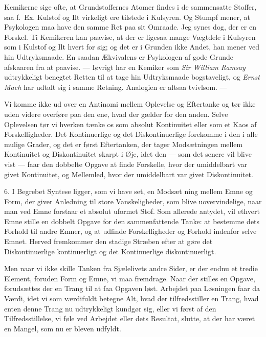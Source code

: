 \documentclass[12pt,a4paper]{book}
\newcommand{\opage}[1]{\marginnote{\footnotesize\textit{[#1]}}}
\begin{document}
Kemikerne sige ofte, at Grundstoffernes Atomer findes i de sammensatte
Stoffer, saa f.\ Ex. Kulstof og Ilt virkeligt ere tilstede i Kulsyren.
Og Stumpf mener, at Psykologen maa have den samme Ret paa sit Omraade.
Jeg synes dog, der er en Forskel. Ti Kemikeren kan paavise, at der er
ligesaa mange Vægtdele i Kulsyren som i Kulstof og Ilt hvert for sig;
og det er i Grunden ikke Andet, han mener ved hin Udtryksmaade. En
saadan Ækvivalens er Psykologen af gode Grunde afskaaren fra at
paavise. --- Iøvrigt har en Kemiker som \emph{Sir William Ramsay}
udtrykkeligt benegtet Retten til at tage hin Udtryksmaade bogstaveligt,
og \emph{Ernst Mach} har udtalt sig i samme Retning. Analogien er
altsaa tvivlsom. ---

Vi komme ikke ud over en Antinomi mellem Oplevelse og Eftertanke og
tør ikke uden videre overføre paa den ene, hvad der gælder for den
anden. Selve Oplevelsen tør vi hverken tænke os som absolut
Kontinuitet eller som et Kaos af Forskelligheder. Det Kontinuerlige og
det Diskontinuerlige forekomme i den i alle mulige Grader, og det er
først Eftertanken, der tager Modsætningen mellem Kontinuitet og
Diskontinuitet skarpt i Øje, idet den --- som det senere vil blive
vist --- faar den dobbelte Opgave at finde Forskelle, hvor der
umiddelbart var givet Kontinuitet, og Mellemled, hvor der umiddelbart
var givet Diskontinuitet.

6. I Begrebet Syntese ligger, som vi have set, en Modsæt%
\opage{20}ning mellem
Emne og Form, der giver Anledning til store Vanskeligheder, som blive
uovervindelige, naar man ved Emne forstaar et absolut uformet Stof.
Som allerede antydet, vil ethvert Emne stille en dobbelt Opgave for
den sammenfattende Tanke: at bestemme dets Forhold til andre Emner, og
at udfinde Forskelligheder og Forhold indenfor selve Emnet. Herved
fremkommer den stadige Stræben efter at gøre det Diskontinuerlige
kontinuerligt og det Kontinuerlige diskontinuerligt.

Men naar vi ikke skille Tanken fra Sjælelivets andre Sider, er der
endnu et tredie Element, foruden Form og Emne, vi maa fremdrage. Naar
der stilles en Opgave, forudsættes der en Trang til at faa Opgaven
løst. Arbejdet paa Løsningen faar da Værdi, idet vi som værdifuldt
betegne Alt, hvad der tilfredsstiller en Trang, hvad enten denne Trang
nu udtrykkeligt kundgør sig, eller vi først af den Tilfredsstillelse,
vi føle ved Arbejdet eller dets Resultat, slutte, at der har været en
Mangel, som nu er bleven udfyldt.
\end{document}
